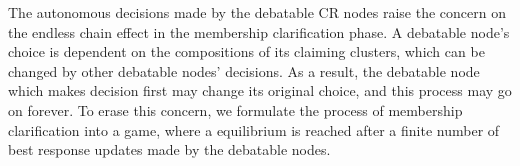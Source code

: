 \documentclass[10pt,journal,compsoc]{IEEEtran}
\theoremstyle{mytheoremstyle}
\theoremstyle{mytheoremstyle}
\theoremstyle{mytheoremstyle}
\begin{document}
The autonomous decisions made by the debatable CR nodes raise the concern on the endless chain effect in the membership clarification phase.
A debatable node's choice is dependent on the compositions of its claiming clusters, which can be changed by other debatable nodes' decisions.
As a result, the debatable node which makes decision first may change its original choice, and this process may go on forever.
To erase this concern, we formulate the process of membership clarification into a game, where a equilibrium is reached after a finite number of best response updates made by the debatable nodes.

\end{document}
